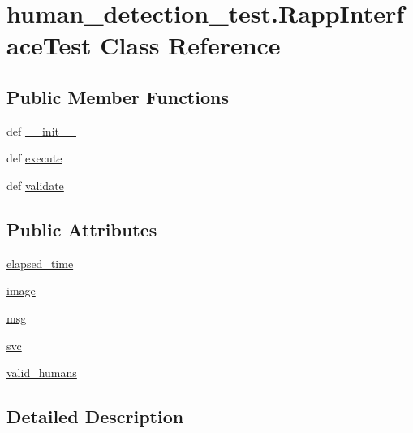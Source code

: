 \hypertarget{classhuman__detection__test_1_1RappInterfaceTest}{\section{human\-\_\-detection\-\_\-test.\-Rapp\-Interface\-Test Class Reference}
\label{classhuman__detection__test_1_1RappInterfaceTest}
}
\subsection*{Public Member Functions}
\begin{DoxyCompactItemize}
\item 
def \hyperlink{classhuman__detection__test_1_1RappInterfaceTest_aaf1e76e614939d8531455fbc0bce58ee}{\-\_\-\-\_\-init\-\_\-\-\_\-}
\item 
def \hyperlink{classhuman__detection__test_1_1RappInterfaceTest_aeaaa2ef0d4d1b08eaab0eb2347a7dab3}{execute}
\item 
def \hyperlink{classhuman__detection__test_1_1RappInterfaceTest_a4fc83697cfcb85d45f4a05fad8166a99}{validate}
\end{DoxyCompactItemize}
\subsection*{Public Attributes}
\begin{DoxyCompactItemize}
\item 
\hyperlink{classhuman__detection__test_1_1RappInterfaceTest_a9fb025721e27f833a1f0409912dcd365}{elapsed\-\_\-time}
\item 
\hyperlink{classhuman__detection__test_1_1RappInterfaceTest_ad10d8f00df9668dc8a379d23ec1e2c36}{image}
\item 
\hyperlink{classhuman__detection__test_1_1RappInterfaceTest_ad1df2dde095583380dc11e207e2afdba}{msg}
\item 
\hyperlink{classhuman__detection__test_1_1RappInterfaceTest_a4ab219e015309bc8a3dcc43364c85dc6}{svc}
\item 
\hyperlink{classhuman__detection__test_1_1RappInterfaceTest_ad2f725843b08f9c88d69c2019779fc71}{valid\-\_\-humans}
\end{DoxyCompactItemize}


\subsection{Detailed Description}


